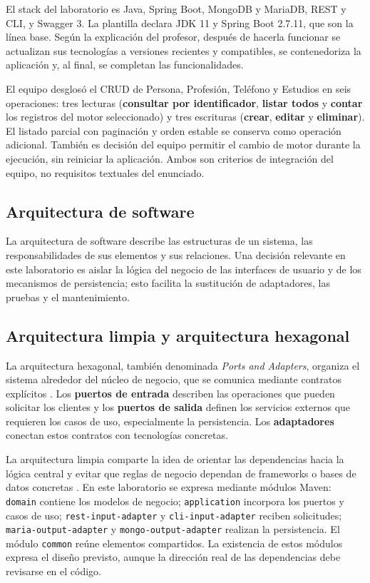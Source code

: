 \documentclass[11pt,a4paper]{article}
\begin{document}
El stack del laboratorio es Java, Spring Boot, MongoDB y MariaDB, REST y CLI,
y Swagger 3. La plantilla declara JDK 11 y Spring Boot 2.7.11, que son la línea
base. Según la explicación del profesor, después de hacerla funcionar se
actualizan sus tecnologías a versiones recientes y compatibles, se contenedoriza
la aplicación y, al final, se completan las funcionalidades.

El equipo desglosó el CRUD de Persona, Profesión, Teléfono y Estudios en seis
operaciones: tres lecturas (\textbf{consultar por identificador}, \textbf{listar
todos} y \textbf{contar} los registros del motor seleccionado) y tres escrituras
(\textbf{crear}, \textbf{editar} y \textbf{eliminar}). El listado parcial con
paginación y orden estable se conserva como operación adicional. También es decisión del equipo permitir el
cambio de motor durante la ejecución, sin reiniciar la aplicación. Ambos son
criterios de integración del equipo, no requisitos textuales del enunciado.

\subsection{Arquitectura de software}
La arquitectura de software describe las estructuras de un sistema, las
responsabilidades de sus elementos y sus relaciones. Una decisión relevante en
este laboratorio es aislar la lógica del negocio de las interfaces de usuario
y de los mecanismos de persistencia; esto facilita la sustitución de adaptadores,
las pruebas y el mantenimiento.

\subsection{Arquitectura limpia y arquitectura hexagonal}
La arquitectura hexagonal, también denominada \emph{Ports and Adapters},
organiza el sistema alrededor del núcleo de negocio, que se comunica mediante
contratos explícitos \cite{cockburn}. Los \textbf{puertos de entrada} describen
las operaciones que pueden solicitar los clientes y los \textbf{puertos de salida}
definen los servicios externos que requieren los casos de uso, especialmente
la persistencia. Los \textbf{adaptadores} conectan estos contratos con
tecnologías concretas.

La arquitectura limpia comparte la idea de orientar las dependencias hacia
la lógica central y evitar que reglas de negocio dependan de frameworks o bases
de datos concretas \cite{martin}. En este laboratorio se expresa mediante
módulos Maven: \texttt{domain} contiene los modelos de negocio;
\texttt{application} incorpora los puertos y casos de uso;
\texttt{rest-input-adapter} y \texttt{cli-input-adapter} reciben solicitudes;
\texttt{maria-output-adapter} y \texttt{mongo-output-adapter} realizan la
persistencia. El módulo \texttt{common} reúne elementos compartidos. La existencia
de estos módulos expresa el diseño previsto, aunque la dirección real de las
dependencias debe revisarse en el código.
\end{document}
